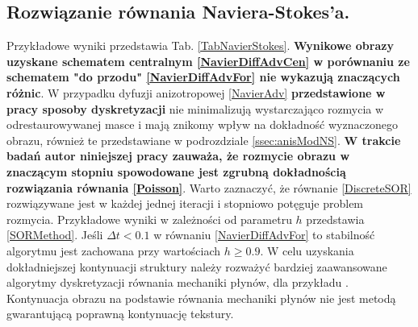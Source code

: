\documentclass[12pt, twoside, openany]{report}
\theoremstyle{definition}
\begin{document}
\subsection{Rozwiązanie równania Naviera-Stokes'a.}
Przykładowe wyniki  przedstawia Tab. \ref{TabNavierStokes}. \textbf{Wynikowe obrazy uzyskane schematem centralnym \eqref{NavierDiffAdvCen} w porównaniu ze schematem "do przodu" \eqref{NavierDiffAdvFor} nie wykazują znaczących różnic}. W przypadku dyfuzji anizotropowej \eqref{NavierAdv}  \textbf{przedstawione w pracy sposoby dyskretyzacji} nie minimalizują wystarczająco rozmycia w odrestaurowywanej masce i mają znikomy wpływ na dokładność wyznaczonego obrazu, również te przedstawiane w podrozdziale \ref{ssec:anisModNS}. \textbf{W trakcie badań autor niniejszej pracy zauważa, że rozmycie obrazu w znaczącym stopniu spowodowane jest zgrubną dokładnością rozwiązania równania \eqref{Poisson}}. Warto zaznaczyć, że równanie \eqref{DiscreteSOR} rozwiązywane jest w każdej jednej iteracji i stopniowo potęguje problem rozmycia. Przykładowe wyniki w zależności od parametru $h$  przedstawia \autoref{SORMethod}. Jeśli $\Delta t <0.1$ w równaniu \eqref{NavierDiffAdvFor} to stabilność algorytmu jest zachowana przy wartościach $h \geq 0.9$. W celu uzyskania dokładniejszej kontynuacji struktury należy rozważyć bardziej zaawansowane algorytmy dyskretyzacji równania mechaniki płynów, dla przykładu \cite{tschumperle2006fast}. Kontynuacja obrazu na podstawie równania mechaniki płynów nie jest metodą gwarantującą poprawną kontynuację tekstury. 
\end{document}
